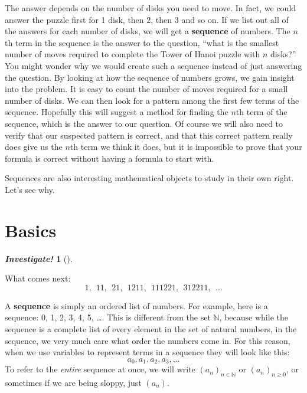 \documentclass[10pt,]{book}
\newcommand{\terminology}[1]{\textbf{#1}}
\theoremstyle{plain}
\theoremstyle{definition}
\theoremstyle{definition}
\newtheorem{investigation}[project]{\emph{Investigate!}}
\theoremstyle{definition}
\numberwithin{equation}{chapter}
\def\N{\mathbb N}
\begin{document}
      The answer depends on the number of disks you need to move. In fact, we could answer the puzzle first for 1 disk, then 2, then 3 and so on. If we list out all of the answers for each number of disks, we will get a \terminology{sequence} of numbers. The \(n\)th term in the sequence is the answer to the question, ``what is the smallest number of moves required to complete the Tower of Hanoi puzzle with \(n\) disks?'' You might wonder why we would create such a sequence instead of just answering the question. By looking at how the sequence of numbers grows,
      we gain insight into the problem. It is easy to count the number of moves required for a small number of disks. We can then look for a pattern among the
      first few terms of the sequence. Hopefully this will suggest a method for finding the \(n\)th term of the sequence, which is the answer to our question. Of course we will also need to verify that our suspected pattern is correct, and that this correct pattern really does give us the \(n\)th term we think it does, but it is impossible to prove that your formula is correct without having a formula to start with.
\par

      Sequences are also interesting mathematical objects to study in their own right. Let's see why.
\typeout{************************************************}
\typeout{************************************************}
\section[Basics]{Basics}\label{sec_seq_basics}
\begin{investigation}[]\label{investigation-16}

      What comes next:
      \begin{equation*}
        1, ~~11, ~~21, ~~1211, ~~111221, ~~312211, ~~\ldots
      \end{equation*}
\end{investigation}

    A \terminology{sequence} is simply an ordered list of numbers. For example, here is a sequence: 0, 1, 2, 3, 4, 5, \dots{}. This is different from the set \(\N\), because while the sequence is a complete list of every element in the set of natural numbers, in the sequence, we very much care what order the numbers come in. For this reason, when we use variables to represent terms in a sequence they will look like this:
    \begin{equation*}
      a_0, a_1, a_2, a_3, \ldots
    \end{equation*}
    To refer to the \emph{entire} sequence at once, we will write \((a_n)_{n\in\N}\) or \((a_n)_{n\ge 0}\), or sometimes if we are being sloppy, just \((a_n)\). \label{notation-7}
\end{document}
